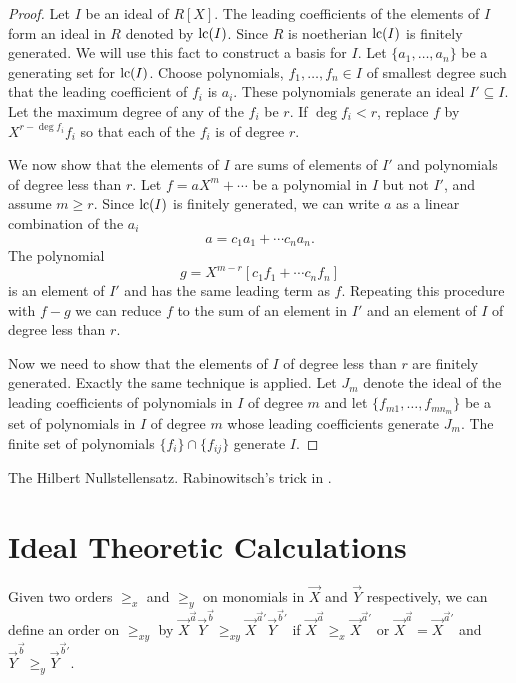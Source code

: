 \begin{proof}
Let $I$ be an ideal of $R[X]$.  The leading coefficients of the
elements of $I$ form an ideal in $R$ denoted by $\mathop{\rm lc}\nolimits(I)$.  Since $R$
is noetherian $\mathop{\rm lc}\nolimits(I)$ is finitely generated.  We will use this fact
to construct a basis for $I$.  Let $\{a_1, \ldots, a_n\}$ be a
generating set for $\mathop{\rm lc}\nolimits(I)$.  Choose polynomials, $f_1, \ldots, f_n
\in I$ of smallest degree such that the leading coefficient of $f_i$
is $a_i$.  These polynomials generate an ideal $I' \subseteq I$.  Let
the maximum degree of any of the $f_i$ be $r$.  If $\deg f_i < r$,
replace $f$ by $X^{r -\deg f_i} f_i$ so that each of the $f_i$ is of
degree $r$.

We now show that the elements of $I$ are sums of elements of $I'$ and
polynomials of degree less than $r$.  Let $f = a X^m + \cdots$ be a
polynomial in $I$ but not $I'$, and assume $m \ge r$.  Since $\mathop{\rm lc}\nolimits(I)$
is finitely generated, we can write $a$ as a linear combination of the
$a_i$
\[
a = c_1 a_1 + \cdots c_n a_n.
\]
The polynomial 
\[
g = X^{m-r} \left[ c_1 f_1 + \cdots c_n f_n \right]
\]
is an element of $I'$ and has the same leading term as $f$.  Repeating
this procedure with $f - g$ we can reduce $f$ to the sum of an element
in $I'$ and an element of $I$ of degree less than $r$.

Now we need to show that the elements of $I$ of degree less than $r$
are finitely generated.  Exactly the same technique is applied.  Let
$J_m$ denote the ideal of the leading coefficients of polynomials in
$I$ of degree $m$ and let $\{ f_{m1}, \ldots, f_{m n_m} \}$ be a set
of polynomials in $I$ of degree $m$ whose leading coefficients
generate $J_m$.  The finite set of polynomials $\{f_i \} \cap \{f_{ij}
\}$ generate $I$.

\end{proof}

The Hilbert Nullstellensatz.  Rabinowitsch's trick in \cite{Rabinowitsch29}.

\section{Ideal Theoretic Calculations}
\label{Ideal:Arith:Sec}

Given two orders $\ge_{x}$ and $\ge_{y}$ on monomials in $\vec X$ and
$\vec Y$ respectively, we can define an order on $\ge_{xy}$ by $\vec
X^{\vec a} \vec Y^{\vec b} \ge_{xy} \vec X^{\vec a'} \vec Y^{\vec b'}$
if $\vec X^{\vec a} \ge_{x} \vec X^{\vec a'}$ or $\vec X^{\vec a} =
\vec X^{\vec a'}$ and $\vec Y^{\vec b} \ge_{y} \vec Y^{\vec b'}$.

